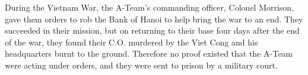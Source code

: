 During the Vietnam War, the A-Team's commanding officer, Colonel Morrison, gave them orders to rob the Bank of Hanoi \cite{Yariv:1989a} to help bring the war to an end. They succeeded in their mission, but on returning to their base four days after the end of the war, they found their C.O. murdered by the Viet Cong and his headquarters burnt to the ground. Therefore no proof existed that the A-Team were acting under orders, and they were sent to prison by a military court.
